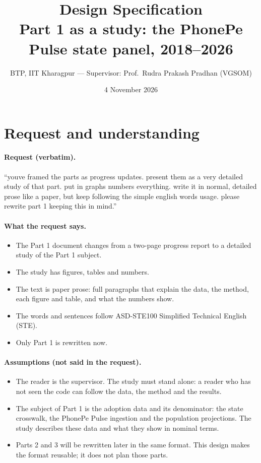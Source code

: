 \documentclass[11pt,a4paper]{article}
\title{Design Specification\\[2pt]\large Part 1 as a study: the PhonePe Pulse state panel, 2018--2026}
\author{BTP, IIT Kharagpur --- Supervisor: Prof.\ Rudra Prakash Pradhan (VGSOM)}
\date{4 November 2026}
\begin{document}
\maketitle

\section{Request and understanding}

\paragraph{Request (verbatim).} ``youve framed the parts as progress updates. present them as a very
detailed study of that part. put in graphs numbers everything. write it in normal, detailed prose like a
paper, but keep following the simple english words usage. please rewrite part 1 keeping this in mind.''

\paragraph{What the request says.}
\begin{itemize}
  \item The Part 1 document changes from a two-page progress report to a detailed study of the
        Part 1 subject.
  \item The study has figures, tables and numbers.
  \item The text is paper prose: full paragraphs that explain the data, the method, each figure and
        table, and what the numbers show.
  \item The words and sentences follow ASD-STE100 Simplified Technical English (STE).
  \item Only Part 1 is rewritten now.
\end{itemize}

\paragraph{Assumptions (not said in the request).}
\begin{itemize}
  \item The reader is the supervisor. The study must stand alone: a reader who has not seen the code
        can follow the data, the method and the results.
  \item The subject of Part 1 is the adoption data and its denominator: the state crosswalk, the
        PhonePe Pulse ingestion and the population projections. The study describes these data and
        what they show in nominal terms.
  \item Parts 2 and 3 will be rewritten later in the same format. This design makes the format
        reusable; it does not plan those parts.
\end{itemize}
\end{document}
